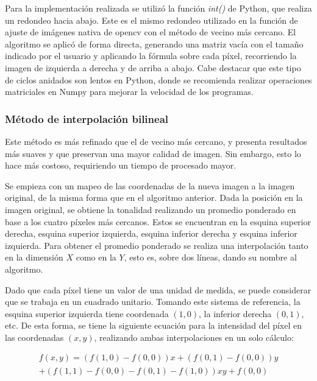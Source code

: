 \documentclass[12pt]{article}
\begin{document}
Para la implementación realizada se utilizó la función \textit{int()} de Python, que realiza un redondeo hacia abajo. Este es el mismo redondeo utilizado en la función de ajuste de imágenes nativa de opencv  con el método de vecino más cercano. El algoritmo se aplicó de forma directa, generando una matriz vacía con el tamaño indicado por el usuario y aplicando la fórmula  sobre cada píxel, recorriendo la imagen de izquierda a derecha y de arriba a abajo. Cabe destacar que este tipo de ciclos anidados son lentos en Python, donde se recomienda realizar operaciones matriciales en Numpy para mejorar la velocidad de los programas. 

\subsubsection{Método de interpolación bilineal}
Este método es más refinado que el de vecino más cercano, y presenta resultados más suaves y que preservan una mayor calidad de imagen. Sin embargo, esto lo hace más costoso, requiriendo un tiempo de procesado mayor. 

Se empieza con un mapeo de las coordenadas de la nueva imagen a la imagen original, de la misma forma que en el algoritmo anterior. Dada la posición en la imagen original, se obtiene la tonalidad realizando un promedio ponderado en base a los cuatro píxeles más cercanos. Estos se encuentran en la esquina superior derecha, esquina superior izquierda, esquina inferior derecha y esquina inferior izquierda. Para obtener el promedio ponderado se realiza una interpolación tanto en la dimensión $X$ como en la $Y$, esto es, sobre dos líneas, dando su nombre al algoritmo.

 Dado que cada píxel tiene un valor de una unidad de medida, se puede considerar que se trabaja en un cuadrado unitario. Tomando este sistema de referencia, la esquina superior izquierda tiene coordenada $(1,0)$, la inferior derecha $(0,1)$, etc. De esta forma, se tiene la siguiente ecuación para la intensidad del píxel en las coordenadas $(x,y)$, realizando ambas interpolaciones en un solo cálculo:

\begin{multline}
	f(x,y) = \left(f(1,0) - f(0,0) \right)x + \left(f(0,1) - f(0,0)\right)y
	\\
	+ \left( f(1,1) - f(0,0) - f(0,1) - f(1,0) \right)xy + f(0,0)
	\label{eq1}
\end{multline}
\end{document}
